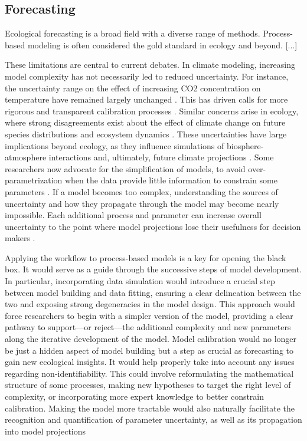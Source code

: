 \documentclass[11pt]{article}
\begin{document}
\subsection{Forecasting}

Ecological forecasting is a broad field with a diverse range of methods. Process-based modeling is often considered the gold standard in ecology \citep{Urban2016, Pilowsky2022} and beyond. [...]

These limitations are central to current debates. In climate modeling, increasing model complexity has not necessarily led to reduced uncertainty. For instance, the uncertainty range on the effect of increasing CO2 concentration on temperature have remained largely unchanged \citep{Zelinka2020}. This has driven calls for more rigorous and transparent calibration processes \citep{balaji2022general}. Similar concerns arise in ecology, where strong disagreements exist about the effect of climate change on future species distributions \citep{Cheaib2012} and ecosystem dynamics \citep{Lovenduski2017}.
These uncertainties have large implications beyond ecology, as they influence simulations of biosphere-atmosphere interactions and, ultimately, future climate projections \citep{Bonan2018, simpson2025confronting}.
Some researchers now advocate for the simplification of models, to avoid over-parametrization when the data provide little information to constrain some parameters \citep{Wang2017, Harrison2021}. If a model becomes too complex, understanding the sources of uncertainty and how they propagate through the model may become nearly impossible.
Each additional process and parameter can increase overall uncertainty to the point where model projections lose their usefulness for decision makers \citep{Saltelli2020}.

Applying the workflow to process-based models is a key for opening the black box. It would serve as a guide through the successive steps of model development. In particular, incorporating data simulation would introduce a crucial step between model building and data fitting, ensuring a clear delineation between the two and exposing strong degeneracies in the model design. This approach would force researchers to begin with a simpler version of the model, providing a clear pathway to support---or reject---the additional complexity and new parameters along the iterative development of the model. 
Model calibration would no longer be just a hidden aspect of model building but a step as crucial as forecasting to gain new ecological insights. It would help properly take into account any issues regarding non-identifiability. This could involve reformulating the mathematical structure of some processes, making new hypotheses to target the right level of complexity, or incorporating more expert knowledge to better constrain calibration. Making the model more tractable would also naturally facilitate the recognition and quantification of parameter uncertainty, as well as its propagation into model projections
\end{document}
